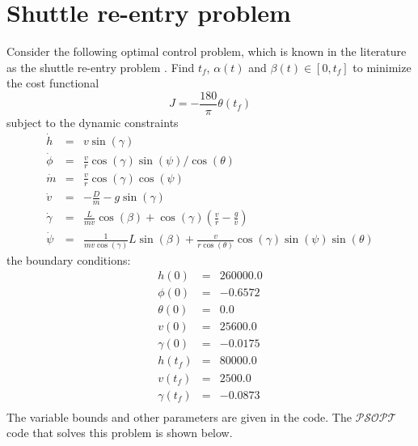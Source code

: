 \documentclass[a4paper,11pt]{report}    %
\newcommand{\psopt}{$\mathcal{PSOPT}$\,}  %
\newenvironment{shadedframe}{%
  \def\FrameCommand{\fcolorbox{black}{shadecolor}}%
  \MakeFramed {\FrameRestore}}
{\endMakeFramed}
\begin{document}
\section{Shuttle re-entry problem}

Consider the following optimal control problem, which is known in the literature
as the shuttle re-entry problem \cite{Betts:01}.  Find $t_f$, $\alpha(t)$ and $\beta(t) \in [0, t_f]$ 
to minimize the cost functional
\begin{equation}
  J =-\frac{180}{\pi}\theta(t_f) 
\end{equation}
subject to the dynamic constraints
\begin{equation}
  \begin{array}{lcl}
   \dot h &=& v\sin(\gamma) \\
   \dot \phi &=& \frac{v}{r}\cos(\gamma) \sin(\psi)/\cos(\theta) \\
   \dot m &=& \frac{v}{r} \cos(\gamma)\cos(\psi) \\
   \dot v &=& -\frac{D}{m}-g \sin (\gamma) \\
   \dot \gamma &=& \frac{L}{mv}\cos(\beta) + \cos(\gamma)(\frac{v}{r}-\frac{g}{v})\\
   \dot \psi &=& \frac{1}{mv \cos(\gamma)} L \sin(\beta) + \frac{v}{r \cos(\theta)} \cos(\gamma) \sin(\psi)\sin(\theta)
  \end{array}
\end{equation}
the boundary conditions:
 \begin{equation}
  \begin{array}{lcl}
   h(0) &=& 260000.0 \\
  \phi(0) &=& -0.6572  \\
  \theta(0) &=&  0.0 \\
  v(0) &=& 25600.0 \\
  \gamma(0) &=&  -0.0175\\
  h(t_f) &=&  80000.0 \\
  v(t_f) &=&  2500.0 \\
  \gamma(t_f) &=& -0.0873\\

  \end{array}
\end{equation}
The variable bounds and other parameters are given in the code.
The \psopt code that solves this problem is shown below.  

\tiny
\begin{shadedframe}

\end{shadedframe}
\normalsize
\end{document}

